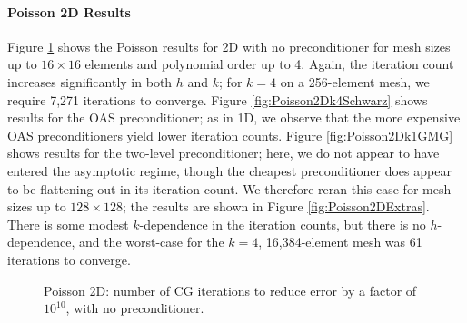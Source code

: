 \paragraph{Poisson 2D Results}
Figure \ref{fig:Poisson2DNoPreconditioner} shows the Poisson results for 2D with no preconditioner for mesh sizes up to $16 \times 16$ elements and polynomial order up to 4.  Again, the iteration count increases significantly in both $h$ and $k$; for $k=4$ on a 256-element mesh, we require 7,271 iterations to converge.  Figure \ref{fig:Poisson2Dk4Schwarz} shows results for the OAS preconditioner; as in 1D, we observe that the more expensive OAS preconditioners yield lower iteration counts.  Figure \ref{fig:Poisson2Dk1GMG} shows results for the two-level preconditioner; here, we do not appear to have entered the asymptotic regime, though the cheapest preconditioner does appear to be flattening out in its iteration count.  We therefore reran this case for mesh sizes up to $128 \times 128$; the results are shown in Figure \ref{fig:Poisson2DExtras}.  There is some modest $k$-dependence in the iteration counts, but there is no $h$-dependence, and the worst-case for the $k=4$, 16,384-element mesh was 61 iterations to converge.
	\begin{figure}[ht]
	\centering
		    \scalebox{\plotscaling}{
			\begin{tikzpicture}
			\begin{axis}[
			    scaled ticks=false,
			    tick label style={/pgf/number format/fixed},
			    title={Poisson 2D, No Preconditioner}, 
			    xlabel={Mesh Width (\# Elements)}, 
			    ylabel={Iteration Count}, 
			    grid=major,
			    legend entries={$k=1$,$k=2$,$k=4$},
			    legend pos=outer north east,
			    xtick=data,
			    xticklabels={2,4,8,16}
			  ]
			  \addplot table [header=false, x index=\meshwidthindex, y index=\iterationcountindex, each nth point=\PoissonTwoDNthPoint, skip first n=1, filter discard warning=false, unbounded coords=discard, skip coords between index={\PoissonTwoDStride}{\maxmyrows}]{data/PoissonDriver2D_results_512_ranks_nonconforming.dat};
			  \addplot table [header=false, x index=\meshwidthindex, y index=\iterationcountindex, each nth point=\PoissonTwoDNthPoint, skip first n=2, filter discard warning=false, unbounded coords=discard, skip coords between index={\PoissonTwoDStride}{\maxmyrows}]{data/PoissonDriver2D_results_512_ranks_nonconforming.dat};
			  \addplot table [header=false, x index=\meshwidthindex, y index=\iterationcountindex, each nth point=\PoissonTwoDNthPoint, skip first n=3, filter discard warning=false, unbounded coords=discard, skip coords between index={\PoissonTwoDStride}{\maxmyrows}]{data/PoissonDriver2D_results_512_ranks_nonconforming.dat};
			\end{axis}
			\end{tikzpicture}
		    }
	\caption{Poisson 2D: number of CG iterations to reduce error by a factor of $10^{10}$, with no preconditioner.}
	\label{fig:Poisson2DNoPreconditioner}
\end{figure}


